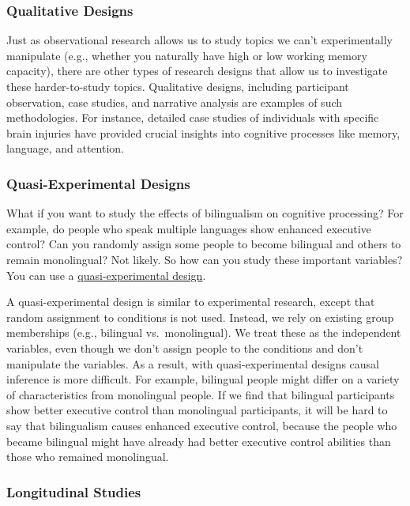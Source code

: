 \documentclass[
]{krantz}
\begin{document}
\subsubsection*{Qualitative Designs}\label{qualitative-designs}


Just as observational research allows us to study topics we can't experimentally manipulate (e.g., whether you naturally have high or low working memory capacity), there are other types of research designs that allow us to investigate these harder-to-study topics. Qualitative designs, including participant observation, case studies, and narrative analysis are examples of such methodologies. For instance, detailed case studies of individuals with specific brain injuries have provided crucial insights into cognitive processes like memory, language, and attention.

\subsubsection*{Quasi-Experimental Designs}\label{quasi-experimental-designs}


What if you want to study the effects of bilingualism on cognitive processing? For example, do people who speak multiple languages show enhanced executive control? Can you randomly assign some people to become bilingual and others to remain monolingual? Not likely. So how can you study these important variables? You can use a \hyperref[quasi-experimental-design]{quasi-experimental design}.

A quasi-experimental design is similar to experimental research, except that random assignment to conditions is not used. Instead, we rely on existing group memberships (e.g., bilingual vs.~monolingual). We treat these as the independent variables, even though we don't assign people to the conditions and don't manipulate the variables. As a result, with quasi-experimental designs causal inference is more difficult. For example, bilingual people might differ on a variety of characteristics from monolingual people. If we find that bilingual participants show better executive control than monolingual participants, it will be hard to say that bilingualism causes enhanced executive control, because the people who became bilingual might have already had better executive control abilities than those who remained monolingual.

\subsubsection*{Longitudinal Studies}\label{longitudinal-studies}
\end{document}
